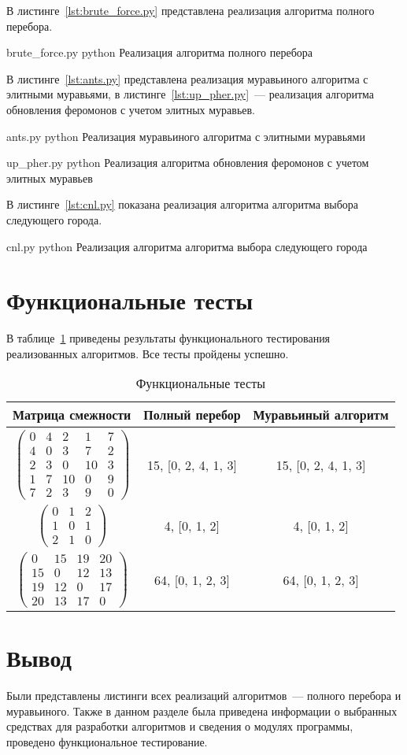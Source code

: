 В листинге~\ref{lst:brute_force.py} представлена реализация алгоритма полного перебора.

{brute_force.py}
{python}
{Реализация алгоритма полного перебора}

В листинге~\ref{lst:ants.py} представлена реализация муравьиного алгоритма с элитными муравьями, в листинге~\ref{lst:up_pher.py}~--- реализация алгоритма обновления феромонов с учетом элитных муравьев.

{ants.py}
{python}
{Реализация муравьиного алгоритма с элитными муравьями}

{up_pher.py}
{python}
{Реализация алгоритма обновления феромонов с учетом элитных муравьев}

В листинге~\ref{lst:cnl.py} показана реализация алгоритма алгоритма выбора следующего города.

{cnl.py}
{python}
{Реализация алгоритма алгоритма выбора следующего города}

\section{Функциональные тесты}

В таблице~\ref{tbl:func-tests} приведены результаты функционального тестирования реализованных алгоритмов.
Все тесты пройдены успешно.

\begin{table}[H]
	\caption{Функциональные тесты}
	\label{tbl:func-tests}
	\centering
	\begin{tabular}{|c|c|c|}
		\hline
		Матрица смежности & Полный перебор & Муравьиный алгоритм \\ \hline
		$ \begin{pmatrix}
			0 &  4 &  2 &  1 & 7 \\
			4 &  0 &  3 &  7 & 2 \\
			2 &  3 &  0 & 10 & 3 \\
			1 &  7 & 10 &  0 & 9 \\
			7 &  2 &  3 &  9 & 0
		\end{pmatrix}$ &
		15, [0, 2, 4, 1, 3] &
		15, [0, 2, 4, 1, 3] \\ \hline
		$ \begin{pmatrix}
			0 & 1 & 2 \\
			1 & 0 & 1 \\
			2 & 1 & 0	
		\end{pmatrix}$ &
		4, [0, 1, 2] &
		4, [0, 1, 2] \\ \hline
		$ \begin{pmatrix}
			0 & 15 & 19 & 20 \\
			15 &  0 & 12 & 13 \\
			19 & 12 &  0 & 17 \\
			20 & 13 & 17 &  0
		\end{pmatrix}$ &
		64, [0, 1, 2, 3] &
		64, [0, 1, 2, 3] \\ \hline
	\end{tabular}
\end{table}

\section*{Вывод}

Были представлены листинги всех реализаций алгоритмов~--- полного перебора и муравьиного.
Также в данном разделе была приведена информации о выбранных средствах для разработки алгоритмов и сведения о модулях программы, проведено функциональное тестирование.